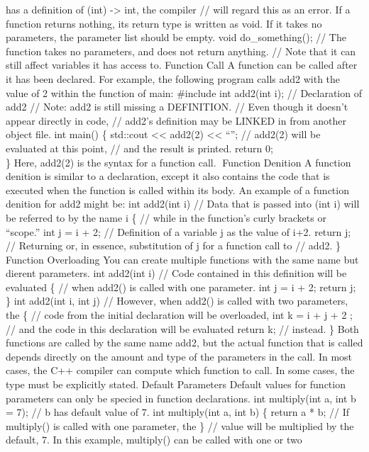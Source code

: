 {has a definition of (int) -\textgreater{} int, the compiler // will
regard this as an error. If a function returns nothing, its return type
is written as void. If it takes no parameters, the parameter list should
be empty. void do\_something(); // The function takes no parameters, and
does not return anything. // Note that it can still affect variables it
has access to. Function Call A function can be called after it has been
declared. For example, the following program calls add2 with the value
of 2 within the function of main: \#include int add2(int i); //
Declaration of add2 // Note: add2 is still missing a DEFINITION. // Even
though it doesn't appear directly in code, // add2's definition may be
LINKED in from another object file. int main() \{ std::cout
\textless\textless{} add2(2) \textless\textless{} ``\n''; // add2(2)
will be evaluated at this point, // and the result is printed. return
0;\\
\} Here, add2(2) is the syntax for a function call. Function Denition A
function denition} is similar to a declaration, except it also contains
the code that is executed when the function is called within its body.
An example of a function denition for add2 might be: int add2(int i) //
Data that is passed into (int i) will be referred to by the name i \{ //
while in the function's curly brackets or ``scope.'' int j = i + 2; //
Definition of a variable j as the value of i+2. return j; // Returning
or, in essence, substitution of j for a function call to // add2. \}
Function Overloading You can create multiple functions with the same
name but dierent parameters. int add2(int i) // Code contained in this
definition will be evaluated \{ // when add2() is called with one
parameter. int j = i + 2; return j; \} int add2(int i, int j) //
However, when add2() is called with two parameters, the \{ // code from
the initial declaration will be overloaded, int k = i + j + 2 ; // and
the code in this declaration will be evaluated return k; // instead. \}
Both functions are called by the same name add2, but the actual function
that is called depends directly on the amount and type of the parameters
in the call. In most cases, the C++ compiler can compute which function
to call. In some cases, the type must be explicitly stated. Default
Parameters Default values for function parameters can only be specied in
function declarations. int multiply(int a, int b = 7); // b has default
value of 7. int multiply(int a, int b) \{ return a * b; // If multiply()
is called with one parameter, the \} // value will be multiplied by the
default, 7. In this example, multiply() can be called with one or two
